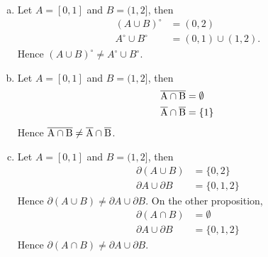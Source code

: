 \begin{Exercise}
\begin{enumerate}[a)]
\item 
\begin{solution}
Let $A=[0,1]$ and $B=(1,2]$, then
\begin{align*}
(A\cup B)^\circ &= (0,2) \\
A^\circ \cup B^\circ &= (0,1)\cup(1,2).
\end{align*}
Hence $(A\cup B)^\circ \neq A^\circ \cup B^\circ$.
\end{solution}

\item 
\begin{solution}
Let $A=[0,1]$ and $B=(1,2]$, then
\begin{align*}
\overline{\rm A\cap B} &= \emptyset \\
\overline{\rm A}\cap \overline{\rm B} &= \{1\}
\end{align*}
Hence $\overline{\rm A\cap B} \neq \overline{\rm A}\cap \overline{\rm B}$.
\end{solution}

\item 
\begin{solution}
Let $A=[0,1]$ and $B=(1,2]$, then
\begin{align*}
\partial (A\cup B) &= \{0,2\} \\
\partial A\cup \partial B &= \{0,1,2\}
\end{align*}
Hence $\partial (A\cup B) \neq \partial A\cup \partial B$. On the other proposition,
\begin{align*}
\partial (A\cap B) &= \emptyset \\
\partial A\cup \partial B &= \{0,1,2\}
\end{align*}
Hence $\partial (A\cap B) \neq \partial A\cup \partial B$.
\end{solution}

\end{enumerate}
\end{Exercise}